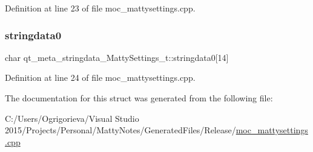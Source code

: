Definition at line 23 of file moc\+\_\+mattysettings.\+cpp.

\hypertarget{structqt__meta__stringdata__MattySettings__t_a43a73d36a65041d9e497357ede476017}{}\label{structqt__meta__stringdata__MattySettings__t_a43a73d36a65041d9e497357ede476017} 
\subsubsection{\texorpdfstring{stringdata0}{stringdata0}}
{\footnotesize\ttfamily char qt\+\_\+meta\+\_\+stringdata\+\_\+\+Matty\+Settings\+\_\+t\+::stringdata0\mbox{[}14\mbox{]}}



Definition at line 24 of file moc\+\_\+mattysettings.\+cpp.



The documentation for this struct was generated from the following file\+:\begin{DoxyCompactItemize}
\item 
C\+:/\+Users/\+Ogrigorieva/\+Visual Studio 2015/\+Projects/\+Personal/\+Matty\+Notes/\+Generated\+Files/\+Release/\hyperlink{moc__mattysettings_8cpp}{moc\+\_\+mattysettings.\+cpp}\end{DoxyCompactItemize}
